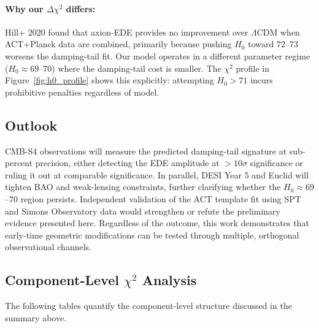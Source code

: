 \documentclass[a4paper,11pt]{article}
\begin{document}
\paragraph{Why our $\Delta\chi^2$ differs:}
Hill+ 2020 found that axion-EDE provides no improvement over $\Lambda$CDM when ACT+Planck data are combined, primarily because pushing $H_0$ toward $72$--$73$ worsens the damping-tail fit. Our model operates in a different parameter regime ($H_0 \approx 69$--$70$) where the damping-tail cost is smaller. The $\chi^2$ profile in Figure~\ref{fig:h0_profile} shows this explicitly: attempting $H_0 > 71$ incurs prohibitive penalties regardless of model.

\subsection*{Outlook}

CMB-S4 observations will measure the predicted damping-tail signature at sub-percent precision, either detecting the EDE amplitude at $>10\sigma$ significance or ruling it out at comparable significance. In parallel, DESI Year 5 and Euclid will tighten BAO and weak-lensing constraints, further clarifying whether the $H_0 \approx 69$--$70$ region persists. Independent validation of the ACT template fit using SPT and Simons Observatory data would strengthen or refute the preliminary evidence presented here. Regardless of the outcome, this work demonstrates that early-time geometric modifications can be tested through multiple, orthogonal observational channels.

\subsection*{Component-Level $\chi^2$ Analysis}

The following tables quantify the component-level structure discussed in the summary above.
\end{document}
